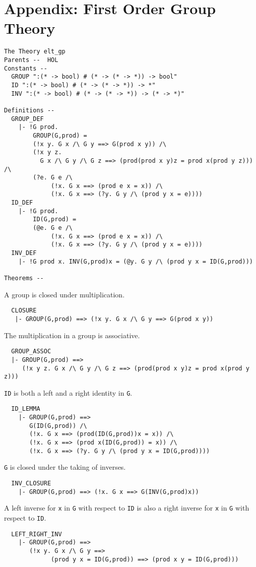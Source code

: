 \section{Appendix: First Order Group Theory}
\begin{verbatim}
The Theory elt_gp
Parents --  HOL     
Constants --
  GROUP ":(* -> bool) # (* -> (* -> *)) -> bool"
  ID ":(* -> bool) # (* -> (* -> *)) -> *"
  INV ":(* -> bool) # (* -> (* -> *)) -> (* -> *)"

Definitions --
  GROUP_DEF
    |- !G prod.
        GROUP(G,prod) =
        (!x y. G x /\ G y ==> G(prod x y)) /\
        (!x y z. 
          G x /\ G y /\ G z ==> (prod(prod x y)z = prod x(prod y z))) /\
        (?e. G e /\
             (!x. G x ==> (prod e x = x)) /\
             (!x. G x ==> (?y. G y /\ (prod y x = e))))
  ID_DEF
    |- !G prod.
        ID(G,prod) =
        (@e. G e /\
             (!x. G x ==> (prod e x = x)) /\
             (!x. G x ==> (?y. G y /\ (prod y x = e))))
  INV_DEF
    |- !G prod x. INV(G,prod)x = (@y. G y /\ (prod y x = ID(G,prod)))

Theorems --
\end{verbatim}
A group is closed under multiplication.
\begin{verbatim}
  CLOSURE 
   |- GROUP(G,prod) ==> (!x y. G x /\ G y ==> G(prod x y))

\end{verbatim}
The multiplication in a group is associative.
\begin{verbatim}
  GROUP_ASSOC
  |- GROUP(G,prod) ==>
     (!x y z. G x /\ G y /\ G z ==> (prod(prod x y)z = prod x(prod y z)))

\end{verbatim}
{\tt ID} is both a left and a right identity in {\tt G}.
\begin{verbatim}
  ID_LEMMA
    |- GROUP(G,prod) ==>
       G(ID(G,prod)) /\
       (!x. G x ==> (prod(ID(G,prod))x = x)) /\
       (!x. G x ==> (prod x(ID(G,prod)) = x)) /\
       (!x. G x ==> (?y. G y /\ (prod y x = ID(G,prod))))

\end{verbatim}
{\tt G} is closed under the taking of inverses.
\begin{verbatim}
  INV_CLOSURE
    |- GROUP(G,prod) ==> (!x. G x ==> G(INV(G,prod)x))

\end{verbatim}
A left inverse for {\tt x} in {\tt G} with respect to {\tt ID} is also a right
inverse for {\tt x} in {\tt G} with respect to {\tt ID}.
\begin{verbatim}
  LEFT_RIGHT_INV
    |- GROUP(G,prod) ==>
       (!x y. G x /\ G y ==>
             (prod y x = ID(G,prod)) ==> (prod x y = ID(G,prod)))

\end{verbatim}
